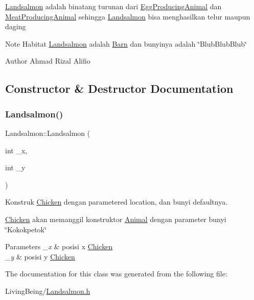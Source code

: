 \mbox{\hyperlink{classLandsalmon}{Landsalmon}} adalah binatang turunan dari \mbox{\hyperlink{classEggProducingAnimal}{Egg\+Producing\+Animal}} dan \mbox{\hyperlink{classMeatProducingAnimal}{Meat\+Producing\+Animal}} sehingga \mbox{\hyperlink{classLandsalmon}{Landsalmon}} bisa menghasilkan telur maupun daging

\begin{DoxyNote}{Note}
Habitat \mbox{\hyperlink{classLandsalmon}{Landsalmon}} adalah \mbox{\hyperlink{classBarn}{Barn}} dan bunyinya adalah \char`\"{}\+Blub\+Blub\+Blub\char`\"{}
\end{DoxyNote}
\begin{DoxyAuthor}{Author}
Ahmad Rizal Alifio 
\end{DoxyAuthor}


\subsection{Constructor \& Destructor Documentation}
\mbox{\label{classLandsalmon_ad48e73eaf7d9799ea6b1d1365bcacb04}} 
\subsubsection{\texorpdfstring{Landsalmon()}{Landsalmon()}}
{\footnotesize\ttfamily Landsalmon\+::\+Landsalmon (\begin{DoxyParamCaption}\item[{int}]{\+\_\+x,  }\item[{int}]{\+\_\+y }\end{DoxyParamCaption})}



Konstruk \mbox{\hyperlink{classChicken}{Chicken}} dengan parametered location, dan bunyi defaultnya. 

\mbox{\hyperlink{classChicken}{Chicken}} akan memanggil konstruktor \mbox{\hyperlink{classAnimal}{Animal}} dengan parameter bunyi \char`\"{}\+Kokokpetok\char`\"{}


\begin{DoxyParams}{Parameters}
{\em \+\_\+x} & posisi x \mbox{\hyperlink{classChicken}{Chicken}} \\
\hline
{\em \+\_\+y} & posisi y \mbox{\hyperlink{classChicken}{Chicken}} \\
\hline
\end{DoxyParams}


The documentation for this class was generated from the following file\+:\begin{DoxyCompactItemize}
\item 
Living\+Being/\mbox{\hyperlink{Landsalmon_8h}{Landsalmon.\+h}}\end{DoxyCompactItemize}
